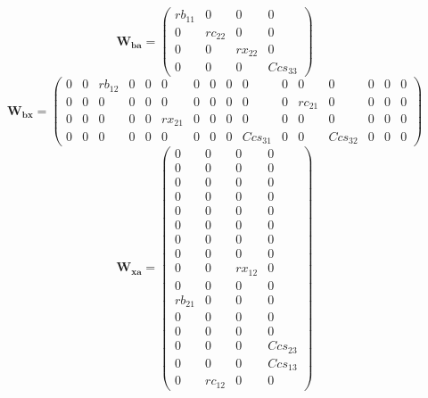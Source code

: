 \[ \mathbf{W_{ba}} = \left(\begin{smallmatrix} rb_{11} & 0 & 0 & 0 \\
0 & rc_{22} & 0 & 0 \\ 0 & 0 & rx_{22} & 0 \\ 0 & 0 & 0 & Ccs_{33}
\end{smallmatrix}\right) \]
\[ \mathbf{W_{bx}} = \left(\begin{smallmatrix} 0 & 0 & rb_{12} & 0 & 0
& 0 & 0 & 0 & 0 & 0 & 0 & 0 & 0 & 0 & 0 & 0 \\ 0 & 0 & 0 & 0 & 0 & 0 &
0 & 0 & 0 & 0 & 0 & rc_{21} & 0 & 0 & 0 & 0 \\ 0 & 0 & 0 & 0 & 0 &
rx_{21} & 0 & 0 & 0 & 0 & 0 & 0 & 0 & 0 & 0 & 0 \\ 0 & 0 & 0 & 0 & 0 &
0 & 0 & 0 & 0 & Ccs_{31} & 0 & 0 & Ccs_{32} & 0 & 0 & 0
\end{smallmatrix}\right) \]
\[ \mathbf{W_{xa}} = \left(\begin{smallmatrix} 0 & 0 & 0 & 0 \\ 0 & 0
& 0 & 0 \\ 0 & 0 & 0 & 0 \\ 0 & 0 & 0 & 0 \\ 0 & 0 & 0 & 0 \\ 0 & 0 &
0 & 0 \\ 0 & 0 & 0 & 0 \\ 0 & 0 & 0 & 0 \\ 0 & 0 & rx_{12} & 0 \\ 0 &
0 & 0 & 0 \\ rb_{21} & 0 & 0 & 0 \\ 0 & 0 & 0 & 0 \\ 0 & 0 & 0 & 0 \\
0 & 0 & 0 & Ccs_{23} \\ 0 & 0 & 0 & Ccs_{13} \\ 0 & rc_{12} & 0 & 0
\end{smallmatrix}\right) \]
